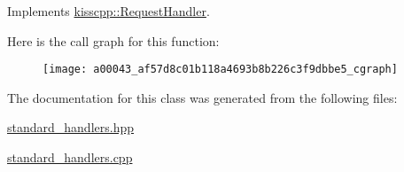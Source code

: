 Implements \hyperlink{a00037_a3606f772c07297826847a8e36226cdaa}{kisscpp\-::\-Request\-Handler}.



Here is the call graph for this function\-:\nopagebreak
\begin{figure}[H]
\begin{center}
\leavevmode
\texttt{[image: a00043\_af57d8c01b118a4693b8b226c3f9dbbe5\_cgraph]}
\end{center}
\end{figure}




The documentation for this class was generated from the following files\-:\begin{DoxyCompactItemize}
\item 
\hyperlink{a00079}{standard\-\_\-handlers.\-hpp}\item 
\hyperlink{a00078}{standard\-\_\-handlers.\-cpp}\end{DoxyCompactItemize}
